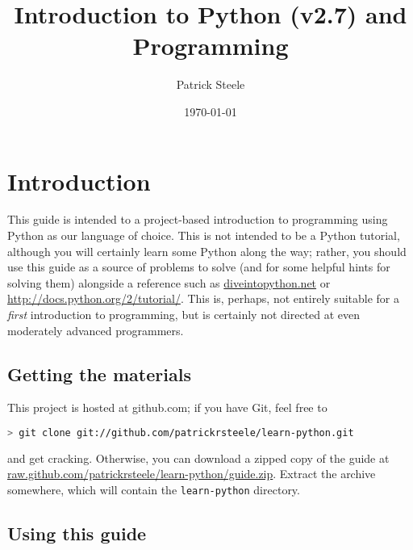 \documentclass{article}
\title{Introduction to Python (v2.7) and Programming}
\author{Patrick Steele}
\date{\today}
\begin{document}
\maketitle

\tableofcontents

\section{Introduction}

This guide is intended to a project-based introduction to programming
using Python as our language of choice. This is not intended to be a
Python tutorial, although you will certainly learn some Python along
the way; rather, you should use this guide as a source of problems to
solve (and for some helpful hints for solving them) alongside a
reference such as \url{diveintopython.net} or
\url{http://docs.python.org/2/tutorial/}. This is, perhaps, not
entirely suitable for a \textit{first} introduction to programming,
but is certainly not directed at even moderately advanced programmers.

\subsection{Getting the materials}

This project is hosted at github.com; if you have Git, feel free to
\begin{lstlisting}[language=bash]
> git clone git://github.com/patrickrsteele/learn-python.git
\end{lstlisting}
and get cracking. Otherwise, you can download a zipped copy of the
guide at
\url{raw.github.com/patrickrsteele/learn-python/guide.zip}. Extract
the archive somewhere, which will contain the \texttt{learn-python}
directory.

\subsection{Using this guide}
\end{document}
